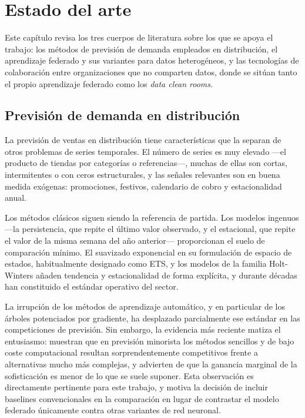\chapter{Estado del arte}
\label{cap:estado_arte}

Este capítulo revisa los tres cuerpos de literatura sobre los que se apoya el trabajo: los métodos
de previsión de demanda empleados en distribución, el aprendizaje federado y sus variantes para
datos heterogéneos, y las tecnologías de colaboración entre organizaciones que no comparten datos,
donde se sitúan tanto el propio aprendizaje federado como los \emph{data clean rooms}.

\section{Previsión de demanda en distribución}

La previsión de ventas en distribución tiene características que la separan de otros problemas de
series temporales. El número de series es muy elevado —el producto de tiendas por categorías o
referencias—, muchas de ellas son cortas, intermitentes o con ceros estructurales, y las señales
relevantes son en buena medida exógenas: promociones, festivos, calendario de cobro y estacionalidad
anual.

Los métodos clásicos siguen siendo la referencia de partida. Los modelos ingenuos —la persistencia,
que repite el último valor observado, y el estacional, que repite el valor de la misma semana del
año anterior— proporcionan el suelo de comparación mínimo. El suavizado exponencial en su
formulación de espacio de estados, habitualmente designado como ETS, y los modelos de la familia
Holt-Winters añaden tendencia y estacionalidad de forma explícita, y durante décadas han constituido
el estándar operativo del sector.

La irrupción de los métodos de aprendizaje automático, y en particular de los árboles potenciados
por gradiente, ha desplazado parcialmente ese estándar en las competiciones de previsión. Sin
embargo, la evidencia más reciente matiza el entusiasmo: \textcite{petropoulos2024} muestran que en
previsión minorista los métodos sencillos y de bajo coste computacional resultan sorprendentemente
competitivos frente a alternativas mucho más complejas, y advierten de que la ganancia marginal de
la sofisticación es menor de lo que se suele suponer. Esta observación es directamente pertinente
para este trabajo, y motiva la decisión de incluir baselines convencionales en la comparación en
lugar de contrastar el modelo federado únicamente contra otras variantes de red neuronal.

